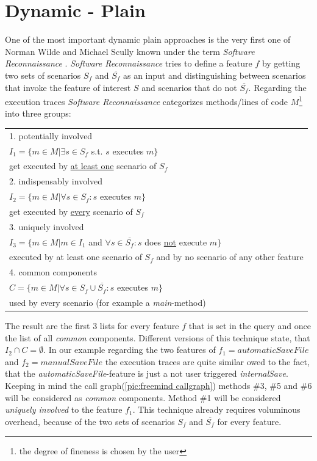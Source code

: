 \section{Dynamic - Plain}
\label{sec:Wilde}
One of the most important dynamic plain approaches is the very first one of Norman Wilde and Michael Scully known under the term \emph{Software Reconnaissance} \cite{wilde1995software}. \textit{Software Reconnaissance} tries to define a feature $f$ by getting two sets of scenarios $S_f$ and $\overline{S_f}$ as an input and distinguishing between scenarios that invoke the feature of interest $S$ and scenarios that do not $\overline{S_f}$. \newline
Regarding the execution traces \textit{Software Reconnaissance} categorizes methods/lines of code $M$\footnote{the degree of fineness is chosen by the user} into three groups:
\begin{table}[h]
	\begin{tabular}{l}
		1. potentially involved  \\
 		\qquad $I_1 = \{ m \in M | \exists s \in S_f$ s.t. $s$ executes $m \}$ \\
 		\qquad get executed by \underline{at least one} scenario of $S_f$\\
		2. indispensably involved  \\
		\qquad $I_2 = \{ m \in M | \forall s \in S_f : s$ executes $m \}$ \\
		\qquad get executed by \underline{every} scenario of $S_f$\\
		3. uniquely involved  \\
		\qquad $I_3 = \{ m \in M | m \in I_1$ and $\forall s\in \overline{S_f} : s$ does \underline{not} execute $m \}$ \\
		\qquad executed by at least one scenario of $S_f$ and by no scenario of any other feature\\
		4. common components  \\
		\qquad $C = \{ m \in M | \forall s \in S_f \cup \overline{S_f}:s$ executes $m \}$ \\
		\qquad used by every scenario (for example a \textit{main}-method)
	\end{tabular}
\end{table}
The result are the first 3 lists for every feature $f$ that is set in the query and once the list of all \textit{common} components. Different versions of this technique state, that $I_2 \cap C = \emptyset$.\cite{wilde1995software} \newline
\emptyLine
In our example regarding the two features of $f_1 = automaticSaveFile$ and $f_2 = manualSaveFile$ the execution traces are quite similar owed to the fact, that the \textit{automaticSaveFile}-feature is just a not user triggered \textit{internalSave}. Keeping in mind the call graph(\autoref{pic:freemind callgraph}) methods \#3, \#5 and \#6 will be considered as \textit{common} components. Method \#1 will be considered \textit{uniquely involved} to the feature $f_1$. \newline
\emptyLine
This technique already requires voluminous overhead, because of the two sets of scenarios $S_f$ and $\overline{S_f}$ for every feature.



